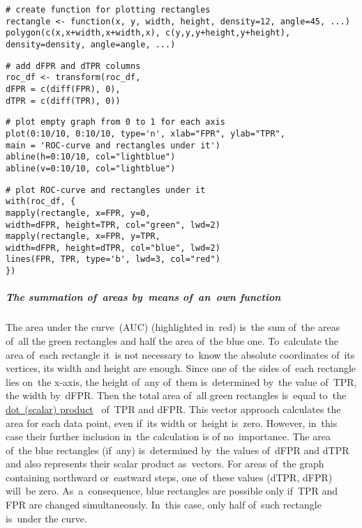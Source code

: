 \documentclass[]{scrreprt}
\begin{document}
%
\begin{lstlisting}[float, caption = Create the \textbf{rectangle} function, firstnumber=1, label= lst:create-rectangle-function-r]
# create function for plotting rectangles
rectangle <- function(x, y, width, height, density=12, angle=45, ...) 
polygon(c(x,x+width,x+width,x), c(y,y,y+height,y+height), 
density=density, angle=angle, ...)
\end{lstlisting}
%
\begin{lstlisting}[float, caption = Adding \textit{dFPR} and \textit{dTPR} columns, firstnumber=1, label= lst:add-dFPR&dTPR-columns-r]
# add dFPR and dTPR columns
roc_df <- transform(roc_df, 
dFPR = c(diff(FPR), 0),
dTPR = c(diff(TPR), 0))
\end{lstlisting}
%
\begin{lstlisting}[float, caption = Drawing an~empty graph and marking axes from~0 to~1, firstnumber=1, label= lst:plot-empty-graph-from-0-to-1-r]
# plot empty graph from 0 to 1 for each axis
plot(0:10/10, 0:10/10, type='n', xlab="FPR", ylab="TPR",
main = 'ROC-curve and rectangles under it')
abline(h=0:10/10, col="lightblue")
abline(v=0:10/10, col="lightblue")
\end{lstlisting}
%
\begin{lstlisting}[float, caption = Construction of~ROC curve and rectangles under~it, firstnumber=1, label= lst:plot-ROC-curve-and-rectangles-under-it-r]
# plot ROC-curve and rectangles under it
with(roc_df, {
mapply(rectangle, x=FPR, y=0,   
width=dFPR, height=TPR, col="green", lwd=2)
mapply(rectangle, x=FPR, y=TPR, 
width=dFPR, height=dTPR, col="blue", lwd=2)
lines(FPR, TPR, type='b', lwd=3, col="red")
})
\end{lstlisting}

\subparagraph{The summation of~areas by~means of~an~own function}
The area under the curve~(AUC) (highlighted in~red) is~the sum of~the areas of~all the green rectangles and half the area of~the blue one. To~calculate the area of~each rectangle it~is not necessary to~know the absolute coordinates of~its vertices, its width and height are enough. Since one of~the sides of~each rectangle lies on~the x-axis, the height of~any of~them is~determined by~the value of~TPR, the width by~dFPR. Then the total area of~all green rectangles is~equal to~the \href{https://en.wikipedia.org/wiki/Dot_product}{dot~(scalar) product}~\cite{Wiki:dot-product} of~TPR and dFPR. This vector approach calculates the area for each data point, even if~its width or~height is~zero. However, in~this case their further inclusion in~the calculation is of no~importance. The area of~the blue rectangles (if~any) is~determined by~the values of~dFPR and dTPR and also represents their scalar product as~vectors. For areas of~the graph containing northward or~eastward steps, one of~these values (dTPR, dFPR) will~be zero. As~a~consequence, blue rectangles are possible only if~TPR and FPR are changed simultaneously. In~this case, only half of~such rectangle is~under the curve.
\end{document}
